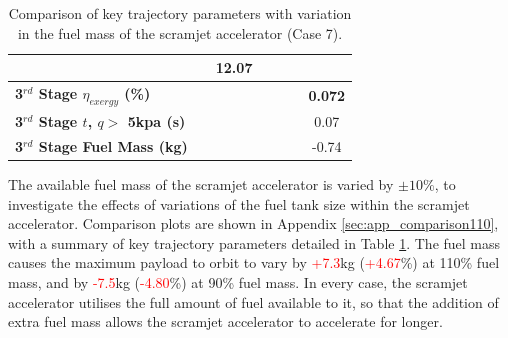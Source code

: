 \begin{table}[!ht]
\begin{tabular}{l c c c c c c}
	& \SecondDistmFuelOneHundredTenNoReturn
	&12.07
	\\
	\hline 
	\textbf{3$^{rd}$ Stage $\eta_{exergy}$ (\%)}
	& \textbf{\thirddExergyEffmFuelNinetyNoReturn}
	& \textbf{\thirddExergyEffmFuelNinetyFiveNoReturn}
	& \textbf{\thirddExergyEffmFuelStandardNoReturn}
	& \textbf{\thirddExergyEffmFuelOneHundredFiveNoReturn}
	& \textbf{\thirddExergyEffmFuelOneHundredTenNoReturn}
	& \textbf{0.072}
	\\
	\textbf{3$^{rd}$ Stage $t$, $q >$ 5kpa (s)}
	& \thirdqOverFivemFuelNinetyNoReturn
	& \thirdqOverFivemFuelNinetyFiveNoReturn
	& \thirdqOverFivemFuelStandardNoReturn
	& \thirdqOverFivemFuelOneHundredFiveNoReturn
	& \thirdqOverFivemFuelOneHundredTenNoReturn
	&0.07
	\\
	\textbf{3$^{rd}$ Stage Fuel Mass (kg)}
	& \thirdmFuelmFuelNinetyNoReturn
	& \thirdmFuelmFuelNinetyFiveNoReturn
	& \thirdmFuelmFuelStandardNoReturn
	& \thirdmFuelmFuelOneHundredFiveNoReturn
	& \thirdmFuelmFuelOneHundredTenNoReturn
	&-0.74
	\\
	\hline 
\end{tabular} 

\caption{Comparison of key trajectory parameters with variation in the fuel mass of the scramjet accelerator (Case 7).}
\label{tab:comparison110}
\end{table}

The available fuel mass of the scramjet accelerator is varied by $\pm 10\%$, to investigate the effects of variations of the fuel tank size within the scramjet accelerator. Comparison plots are shown in Appendix \ref{sec:app_comparison110}, with a summary of key trajectory parameters detailed in Table \ref{tab:comparison110}.
The fuel mass causes the maximum payload to orbit to vary by \textcolor{red}{+7.3}kg (\textcolor{red}{+4.67}\%) at 110\% fuel mass, and by \textcolor{red}{-7.5}kg (\textcolor{red}{-4.80}\%) at 90\% fuel mass. 
 In every case, the scramjet accelerator utilises the full amount of fuel available to it, so that the addition of extra fuel mass allows the scramjet accelerator to accelerate for longer. 

